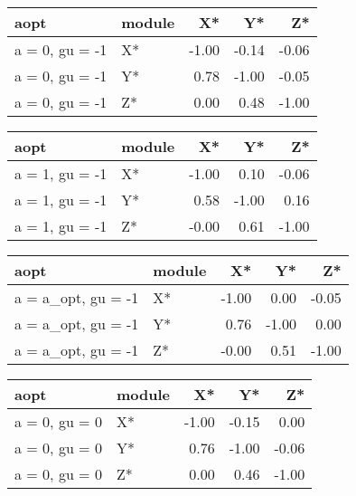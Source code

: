 \documentclass[10pt,a4paper]{article}
\begin{document}
\begin{table}[ht]
\centering
\begin{tabular}{llrrr}
  \hline
aopt & module & X* & Y* & Z* \\ 
  \hline
a = 0, gu = -1 & X* & -1.00 & -0.14 & -0.06 \\ 
  a = 0, gu = -1 & Y* & 0.78 & -1.00 & -0.05 \\ 
  a = 0, gu = -1 & Z* & 0.00 & 0.48 & -1.00 \\ 
   \hline
\end{tabular}
\end{table}


\begin{table}[ht]
\centering
\begin{tabular}{llrrr}
  \hline
aopt & module & X* & Y* & Z* \\ 
  \hline
a = 1, gu = -1 & X* & -1.00 & 0.10 & -0.06 \\ 
  a = 1, gu = -1 & Y* & 0.58 & -1.00 & 0.16 \\ 
  a = 1, gu = -1 & Z* & -0.00 & 0.61 & -1.00 \\ 
   \hline
\end{tabular}
\end{table}


\begin{table}[ht]
\centering
\begin{tabular}{llrrr}
  \hline
aopt & module & X* & Y* & Z* \\ 
  \hline
a = a\_opt, gu = -1 & X* & -1.00 & 0.00 & -0.05 \\ 
  a = a\_opt, gu = -1 & Y* & 0.76 & -1.00 & 0.00 \\ 
  a = a\_opt, gu = -1 & Z* & -0.00 & 0.51 & -1.00 \\ 
   \hline
\end{tabular}
\end{table}


\begin{table}[ht]
\centering
\begin{tabular}{llrrr}
  \hline
aopt & module & X* & Y* & Z* \\ 
  \hline
a = 0, gu = 0 & X* & -1.00 & -0.15 & 0.00 \\ 
  a = 0, gu = 0 & Y* & 0.76 & -1.00 & -0.06 \\ 
  a = 0, gu = 0 & Z* & 0.00 & 0.46 & -1.00 \\ 
   \hline
\end{tabular}
\end{table}
\end{document}
